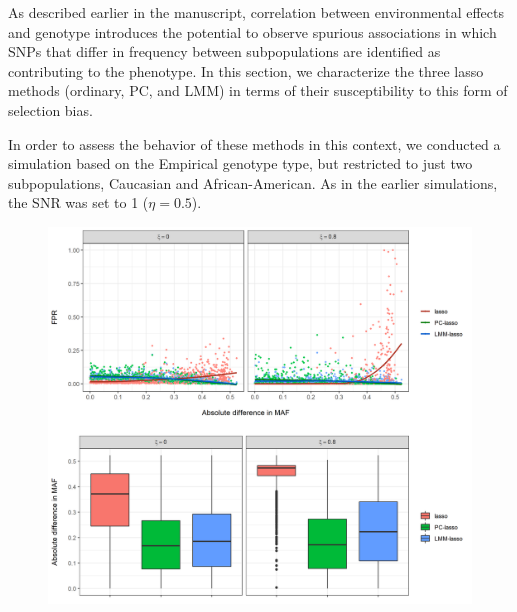 As described earlier in the manuscript, correlation between environmental effects and genotype introduces the potential to observe spurious associations in which SNPs that differ in frequency between subpopulations are identified as contributing to the phenotype.  In this section, we characterize the three lasso methods (ordinary, PC, and LMM) in terms of their susceptibility to this form of selection bias.

In order to assess the behavior of these methods in this context, we conducted a simulation based on the Empirical genotype type, but restricted to just two subpopulations, Caucasian and African-American.  
As in the earlier simulations, the SNR was set to 1 ($\eta = 0.5$).


 \begin{figure}[H]
    \centering
    \includegraphics[width = \textwidth]{figures/pop_inf_snps.png}
    \caption{}
    \label{fig:pop_inf}
\end{figure}

